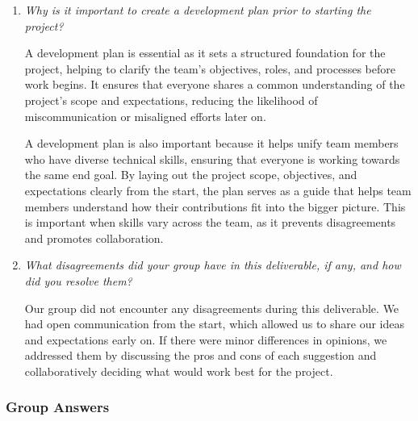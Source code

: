 \documentclass{article}
\begin{document}
\begin{enumerate}
  \item \textit{Why is it important to create a development plan prior to starting the project?}

  A development plan is essential as it sets a structured foundation for the project, helping to 
  clarify the team's objectives, roles, and processes before work begins. It ensures that everyone 
  shares a common understanding of the project's scope and expectations, reducing the likelihood 
  of miscommunication or misaligned efforts later on. 

  A development plan is also important because it helps unify team members who have diverse technical 
  skills, ensuring that everyone is working towards the same end goal. By laying out the project scope, 
  objectives, and expectations clearly from the start, the plan serves as a guide that helps team 
  members understand how their contributions fit into the bigger picture. This is important when 
  skills vary across the team, as it prevents disagreements and promotes collaboration.

  \item \textit{What disagreements did your group have in this deliverable, if any, and how did you resolve them?}

  Our group did not encounter any disagreements during this deliverable. We had open communication from 
  the start, which allowed us to share our ideas and expectations early on. If there were minor differences 
  in opinions, we addressed them by discussing the pros and cons of each suggestion and collaboratively 
  deciding what would work best for the project.

\end{enumerate}

\subsubsection*{Group Answers}
\end{document}
